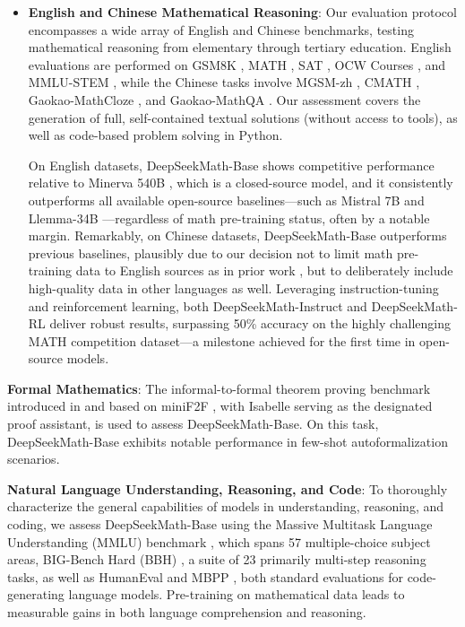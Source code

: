 \begin{itemize}[topsep=0pt]
    \item \textbf{English and Chinese Mathematical Reasoning}: Our evaluation protocol encompasses a wide array of English and Chinese benchmarks, testing mathematical reasoning from elementary through tertiary education. English evaluations are performed on GSM8K \citep{gsm8k}, MATH \citep{MATH}, SAT \citep{llemma}, OCW Courses \citep{minerva}, and MMLU-STEM \citep{mmlu}, while the Chinese tasks involve MGSM-zh \citep{mgsm}, CMATH \citep{wei2023cmath}, Gaokao-MathCloze \citep{agieval}, and Gaokao-MathQA \citep{agieval}. Our assessment covers the generation of full, self-contained textual solutions (without access to tools), as well as code-based problem solving in Python.

    On English datasets, DeepSeekMath-Base shows competitive performance relative to Minerva 540B \citep{minerva}, which is a closed-source model, and it consistently outperforms all available open-source baselines—such as Mistral 7B \citep{mistral} and Llemma-34B \citep{llemma}—regardless of math pre-training status, often by a notable margin. Remarkably, on Chinese datasets, DeepSeekMath-Base outperforms previous baselines, plausibly due to our decision not to limit math pre-training data to English sources as in prior work \citep{minerva,llemma}, but to deliberately include high-quality data in other languages as well. Leveraging instruction-tuning and reinforcement learning, both DeepSeekMath-Instruct and DeepSeekMath-RL deliver robust results, surpassing 50\% accuracy on the highly challenging MATH competition dataset—a milestone achieved for the first time in open-source models.
\end{itemize}

\item \textbf{Formal Mathematics}: The informal-to-formal theorem proving benchmark introduced in \citep{dsp_proof} and based on miniF2F \citep{minif2f}, with Isabelle \citep{isabelle} serving as the designated proof assistant, is used to assess DeepSeekMath-Base. On this task, DeepSeekMath-Base exhibits notable performance in few-shot autoformalization scenarios.
\item \textbf{Natural Language Understanding, Reasoning, and Code}: To thoroughly characterize the general capabilities of models in understanding, reasoning, and coding, we assess DeepSeekMath-Base using the Massive Multitask Language Understanding (MMLU) benchmark \citep{mmlu}, which spans 57 multiple-choice subject areas, BIG-Bench Hard (BBH) \citep{bbh}, a suite of 23 primarily multi-step reasoning tasks, as well as HumanEval \citep{codex} and MBPP \citep{mbpp}, both standard evaluations for code-generating language models. Pre-training on mathematical data leads to measurable gains in both language comprehension and reasoning.

